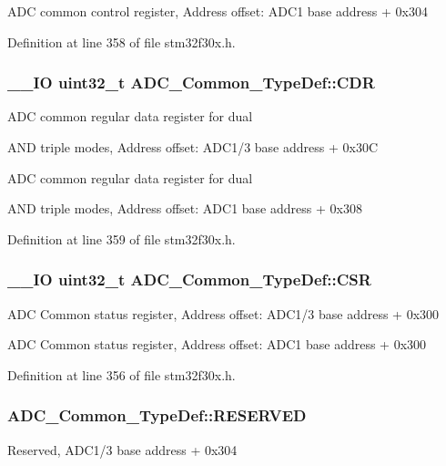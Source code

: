 A\-D\-C common control register, Address offset\-: A\-D\-C1 base address + 0x304 

Definition at line 358 of file stm32f30x.\-h.

\hypertarget{struct_a_d_c___common___type_def_a6f7399bf70f677ef5de46a3038f414e1}{
\subsubsection[{C\-D\-R}]{\setlength{\rightskip}{0pt plus 5cm}\-\_\-\-\_\-\-I\-O {\bf uint32\-\_\-t} A\-D\-C\-\_\-\-Common\-\_\-\-Type\-Def\-::\-C\-D\-R}}\label{struct_a_d_c___common___type_def_a6f7399bf70f677ef5de46a3038f414e1}
\begin{DoxyVerb}            ADC common regular data register for dual
\end{DoxyVerb}
 A\-N\-D triple modes, Address offset\-: A\-D\-C1/3 base address + 0x30\-C

\begin{DoxyVerb}    ADC common regular data register for dual
\end{DoxyVerb}
 A\-N\-D triple modes, Address offset\-: A\-D\-C1 base address + 0x308 

Definition at line 359 of file stm32f30x.\-h.

\hypertarget{struct_a_d_c___common___type_def_ac38e24f600f9e134a54a0c43b976a4f4}{
\subsubsection[{C\-S\-R}]{\setlength{\rightskip}{0pt plus 5cm}\-\_\-\-\_\-\-I\-O {\bf uint32\-\_\-t} A\-D\-C\-\_\-\-Common\-\_\-\-Type\-Def\-::\-C\-S\-R}}\label{struct_a_d_c___common___type_def_ac38e24f600f9e134a54a0c43b976a4f4}
A\-D\-C Common status register, Address offset\-: A\-D\-C1/3 base address + 0x300

A\-D\-C Common status register, Address offset\-: A\-D\-C1 base address + 0x300 

Definition at line 356 of file stm32f30x.\-h.

\hypertarget{struct_a_d_c___common___type_def_a5206a0915a426980291c55c79db38890}{
\subsubsection[{R\-E\-S\-E\-R\-V\-E\-D}]{ A\-D\-C\-\_\-\-Common\-\_\-\-Type\-Def\-::\-R\-E\-S\-E\-R\-V\-E\-D}}\label{struct_a_d_c___common___type_def_a5206a0915a426980291c55c79db38890}
Reserved, A\-D\-C1/3 base address + 0x304 


